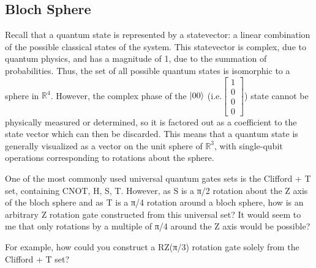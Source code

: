 \documentclass[12pt]{article}
\begin{document}
\subsection{Bloch Sphere}
Recall that a quantum state is represented by a statevector: a linear combination of the possible classical states of the system. This statevector is complex, due to quantum physics, and has a magnitude of 1, due to the summation of probabilities. Thus, the set of all possible quantum states is isomorphic to a sphere in $\mathbb{R}^4$. However, the complex phase of the $\ket{00}$ (i.e.$\left[\begin{smallmatrix} 1 \\ 0 \\ 0 \\ 0 \end{smallmatrix}\right]$) state cannot be physically measured or determined, so it is factored out as a coefficient to the state vector which can then be discarded. This means that a quantum state is generally visualized as a vector on the unit sphere of $\mathbb{R}^3$, with single-qubit operations corresponding to rotations about the sphere.

One of the most commonly used universal quantum gates sets is the Clifford + T set, containing {CNOT, H, S, T}. However, as S is a π/2
 rotation about the Z axis of the bloch sphere and as T is a π/4
 rotation around a bloch sphere, how is an arbitrary Z rotation gate constructed from this universal set? It would seem to me that only rotations by a multiple of π/4
 around the Z axis would be possible?

For example, how could you construct a RZ(π/3)
 rotation gate solely from the Clifford + T set?
\end{document}
